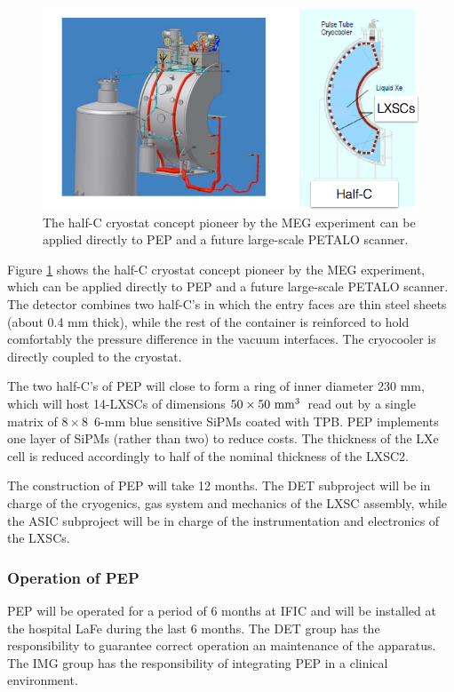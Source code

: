 \begin{figure}[!htb]
	\centering
	\includegraphics[scale=0.35]{img/HalfC.png}
	\caption{\label{fig.halfC} The half-C cryostat concept pioneer by the MEG experiment can be applied directly
	to PEP and a future large-scale PETALO scanner. }
\end{figure}

Figure \ref{fig.halfC} shows the half-C cryostat concept pioneer by the MEG experiment, which can be applied directly to PEP and a future large-scale PETALO scanner. The detector combines two half-C's in which the entry
faces are thin steel sheets (about 0.4 mm thick), while the rest of the container is reinforced to hold comfortably
	the pressure difference in the vacuum interfaces.  The cryocooler is directly coupled to the cryostat.    

The two half-C's of PEP will close to form a ring of inner diameter 230 mm, which will host 14-LXSCs
of dimensions  $50 \times 50 \time 25\mathrm{~mm^3}$~read out by a single matrix of $8 \times 8$~6-mm blue sensitive SiPMs coated with TPB. PEP implements one layer of SiPMs (rather than two) to reduce costs. The thickness of the LXe cell is reduced accordingly to half of the nominal thickness of the LXSC2. 

The construction of PEP will take 12 months. The DET subproject will be in charge of the cryogenics, gas system and mechanics of the LXSC assembly, while the ASIC subproject will be in charge of the instrumentation and electronics of the LXSCs. 



\subsubsection*{Operation of PEP}
PEP will be operated for a period of 6 months at IFIC and will be installed at the hospital LaFe during the last 6 months. The DET group has the responsibility to guarantee correct operation an maintenance of the apparatus. The IMG group has the responsibility of integrating PEP in a clinical environment. 

